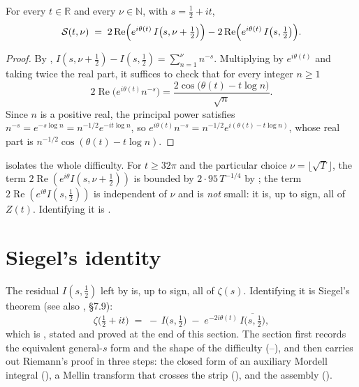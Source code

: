 \begin{theorem}
\label{thm:rsz_reduction}
\leanok
{}
For every $t\in\mathbb{R}$ and every $\nu\in\mathbb{N}$, with $s=\tfrac12+it$,
\[
  \mathcal{S}(t,\nu)\;=\;
  2\operatorname{Re}\Bigl(e^{i\theta(t)}\,I\bigl(s,\nu+\tfrac12\bigr)\Bigr)
  -2\operatorname{Re}\Bigl(e^{i\theta(t)}\,I\bigl(s,\tfrac12\bigr)\Bigr).
\]
\end{theorem}

\begin{proof}
\leanok
{}
By ,
$I(s,\nu+\tfrac12)-I(s,\tfrac12)=\sum_{n=1}^{\nu}n^{-s}$.  Multiplying by
$e^{i\theta(t)}$ and taking twice the real part, it suffices to check that for every
integer $n\ge1$
\[
  2\operatorname{Re}\bigl(e^{i\theta(t)}n^{-s}\bigr)
  =\frac{2\cos\bigl(\theta(t)-t\log n\bigr)}{\sqrt n}.
\]
Since $n$ is a positive real, the principal power satisfies
$n^{-s}=e^{-s\log n}=n^{-1/2}e^{-it\log n}$, so
$e^{i\theta(t)}n^{-s}=n^{-1/2}e^{i(\theta(t)-t\log n)}$, whose real part is
$n^{-1/2}\cos(\theta(t)-t\log n)$.
\end{proof}

\begin{remark}
\label{rem:rsz_left}
 isolates the whole difficulty.  For $t\ge32\pi$ and the
particular choice $\nu=\lfloor\sqrt T\rfloor$, the term
$2\operatorname{Re}(e^{i\theta}I(s,\nu+\tfrac12))$ is bounded by $2\cdot95\,T^{-1/4}$ by
; the term $2\operatorname{Re}(e^{i\theta}I(s,\tfrac12))$
is independent of $\nu$ and is \emph{not} small: it is, up to sign, all of $Z(t)$.
Identifying it is .
\end{remark}

\section{Siegel's identity}
\label{sec:rsz_siegel}

The residual $I(s,\tfrac12)$ left by  is, up to sign, all of
$\zeta(s)$.  Identifying it is Siegel's theorem \cite{Siegel1932} (see also \cite{Edwards},
\S7.9):
\[
  \zeta\bigl(\tfrac12+it\bigr)\;=\;-\,I\bigl(s,\tfrac12\bigr)
     \;-\;e^{-2i\theta(t)}\,\overline{I\bigl(s,\tfrac12\bigr)} ,
\]
which is , stated and proved at the end of this section.  The section
first records the equivalent general-$s$ form and the shape of the difficulty
(--), and then carries out Riemann's proof
in three steps: the closed form of an auxiliary Mordell integral
(), a Mellin transform that crosses the strip
(), and the assembly ().

